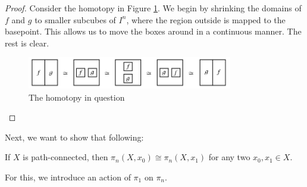   \begin{proof}
      Consider the homotopy in Figure \ref{fig:JIDWOOL0290L-png}.
      We begin by shrinking the domains of $f$ and $g$ to smaller
      subcubes of $I^{n}$, where the region outside is
      mapped to the basepoint. This allows us to move the boxes
      around in a continuous manner. The rest is clear.
      \begin{figure}[htpb]
          \centering
          \includegraphics[width=0.8\textwidth]{Figures/JIDWOOL0290L.png}
          \caption{The homotopy in question}
          \label{fig:JIDWOOL0290L-png}
      \end{figure}
  \end{proof}

  Next, we want to show that following:
  \begin{proposition}[]\label{Prop:SwjiaKKDNW1102}
      If $X$ is path-connected, then
      $\pi_n\left( X, x_0 \right) \cong
      \pi_n (X, x_1)$ for any two $x_0,x_1 \in X$.
  \end{proposition}

  For this, we introduce an action of
  $\pi_1$ on $\pi_n$.

